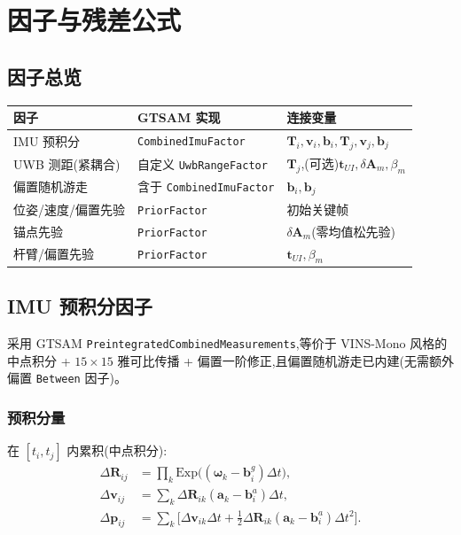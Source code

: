 \documentclass[11pt,a4paper]{report}
\newcommand{\bp}{\bm{p}}
\newcommand{\bv}{\bm{v}}
\newcommand{\bb}{\bm{b}}
\newcommand{\bR}{\bm{R}}
\newcommand{\bT}{\bm{T}}
\newcommand{\bA}{\bm{A}}
\newcommand{\bt}{\bm{t}}
\newcommand{\ba}{\bm{a}}
\newcommand{\bw}{\bm{\omega}}
\begin{document}
\chapter{因子与残差公式}

\section{因子总览}
\begin{longtable}{p{3.6cm} p{4.0cm} p{5.0cm}}
\toprule
因子 & GTSAM 实现 & 连接变量 \\
\midrule
IMU 预积分 & \texttt{CombinedImuFactor} & $\bT_i,\bv_i,\bb_i,\bT_j,\bv_j,\bb_j$ \\
UWB 测距(紧耦合) & 自定义 \texttt{UwbRangeFactor} & $\bT_j$,(可选)$\bt_{UI},\delta\bA_m,\beta_m$ \\
偏置随机游走 & 含于 \texttt{CombinedImuFactor} & $\bb_i,\bb_j$ \\
位姿/速度/偏置先验 & \texttt{PriorFactor} & 初始关键帧 \\
锚点先验 & \texttt{PriorFactor} & $\delta\bA_m$(零均值松先验) \\
杆臂/偏置先验 & \texttt{PriorFactor} & $\bt_{UI},\beta_m$ \\
\bottomrule
\end{longtable}

\section{IMU 预积分因子}
采用 GTSAM \texttt{PreintegratedCombinedMeasurements},等价于 VINS-Mono 风格的中点积分 + $15\times15$ 雅可比传播 + 偏置一阶修正,且偏置随机游走已内建(无需额外偏置 \texttt{Between} 因子)。

\subsection{预积分量}
在 $[t_i,t_j]$ 内累积(中点积分):
\begin{align}
\Delta\bR_{ij} &= \prod_k \mathrm{Exp}\!\big((\bw_k-\bb_i^g)\Delta t\big),\\
\Delta\bv_{ij} &= \sum_k \Delta\bR_{ik}(\ba_k-\bb_i^a)\Delta t,\\
\Delta\bp_{ij} &= \sum_k\Big[\Delta\bv_{ik}\Delta t + \tfrac12\Delta\bR_{ik}(\ba_k-\bb_i^a)\Delta t^2\Big].
\end{align}
\end{document}
